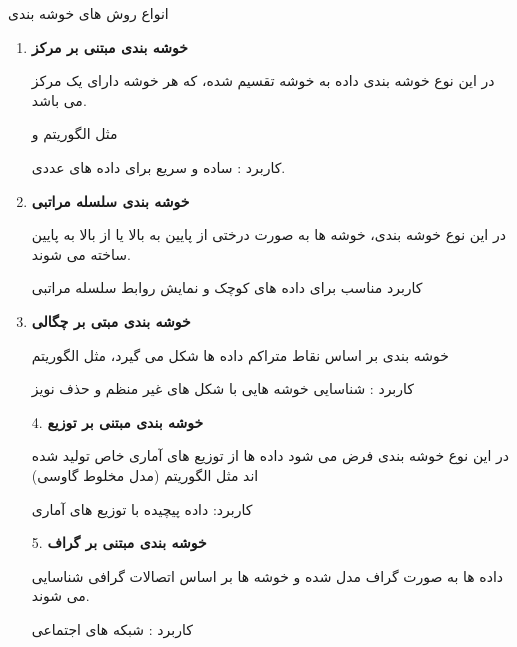 \documentclass[10pt]{beamer}
\begin{document}
	
\begin{frame}{انواع روش های خوشه بندی}
\begin{enumerate}
	\item{\textbf{خوشه بندی مبتنی بر مرکز }}
	
\begin{footnotesize}
	در این نوع خوشه بندی داده به  خوشه تقسیم شده، که هر خوشه دارای یک مرکز می باشد.
	
	مثل الگوریتم  و 
	
	کاربرد : ساده و سریع برای داده های عددی.
\end{footnotesize}
	\item{\textbf{خوشه بندی سلسله مراتبی }}
	\begin{footnotesize}
		
		در این نوع خوشه بندی، خوشه ها به صورت درختی از پایین به بالا یا از بالا به پایین ساخته می شوند.
		
		کاربرد مناسب برای داده های کوچک و نمایش روابط سلسله مراتبی
		
	\end{footnotesize}
	\item{\textbf{ خوشه بندی مبتی بر چگالی}}
	\begin{footnotesize}

خوشه بندی بر اساس نقاط متراکم داده ها شکل می گیرد، مثل الگوریتم 

کاربرد : شناسایی خوشه هایی با شکل های غیر منظم و حذف نویز

	\end{footnotesize}
			\item[4.]{\textbf{خوشه بندی مبتنی بر توزیع \lr{ }}}
			
		\begin{footnotesize}
		در این نوع خوشه بندی فرض می شود داده ها از توزیع های آماری خاص تولید شده اند مثل الگوریتم  (مدل مخلوط گاوسی)

کاربرد: داده پیچیده با توزیع های آماری

		\end{footnotesize}
		\item[5.]{\textbf{ خوشه بندی مبتنی بر گراف\lr{ }}}
		
\begin{footnotesize}
		داده ها به صورت گراف مدل شده و خوشه ها بر اساس اتصالات گرافی شناسایی می شوند.

کاربرد : شبکه های اجتماعی 
\end{footnotesize}
	\end{enumerate}
\end{frame}
	
\end{document}
